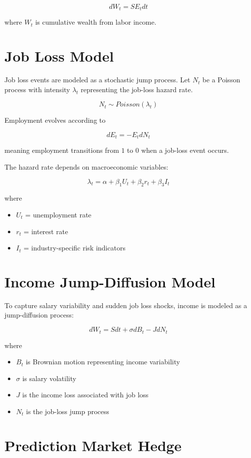 \documentclass[11pt]{article}
\begin{document}
\[
dW_t = S E_t dt
\]

where $W_t$ is cumulative wealth from labor income.


\section{Job Loss Model}

Job loss events are modeled as a stochastic jump process. Let $N_t$ be a Poisson 
process with intensity $\lambda_t$ representing the job-loss hazard rate.

\[
N_t \sim Poisson(\lambda_t)
\]

Employment evolves according to

\[
dE_t = -E_t dN_t
\]

meaning employment transitions from $1$ to $0$ when a job-loss event occurs.

The hazard rate depends on macroeconomic variables:

\[
\lambda_t = \alpha + \beta_1 U_t + \beta_2 r_t + \beta_3 I_t
\]

where

\begin{itemize}
\item $U_t$ = unemployment rate
\item $r_t$ = interest rate
\item $I_t$ = industry-specific risk indicators
\end{itemize}

\section{Income Jump-Diffusion Model}

To capture salary variability and sudden job loss shocks, income is modeled as a 
jump-diffusion process:

\[
dW_t = S dt + \sigma dB_t - J dN_t
\]

where

\begin{itemize}
\item $B_t$ is Brownian motion representing income variability
\item $\sigma$ is salary volatility
\item $J$ is the income loss associated with job loss
\item $N_t$ is the job-loss jump process
\end{itemize}

\section{Prediction Market Hedge}
\end{document}
